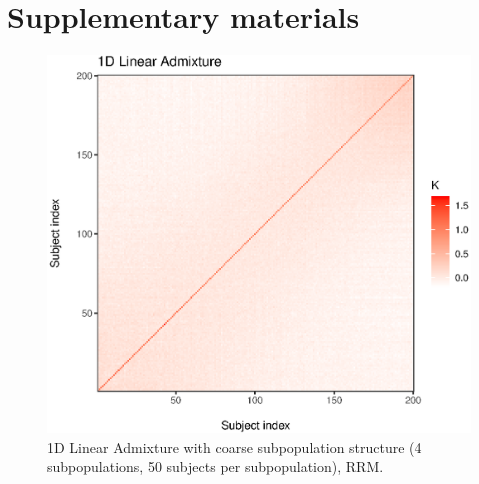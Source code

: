 \section{Supplementary materials}

\begin{figure}[H]
    \centering
    \includegraphics[scale = 1]{figures/admixed_kinship.eps}
    \caption{1D Linear Admixture with coarse subpopulation structure (4 subpopulations, 50 subjects per subpopulation), RRM.}
    \label{fig:admixed}
\end{figure}

